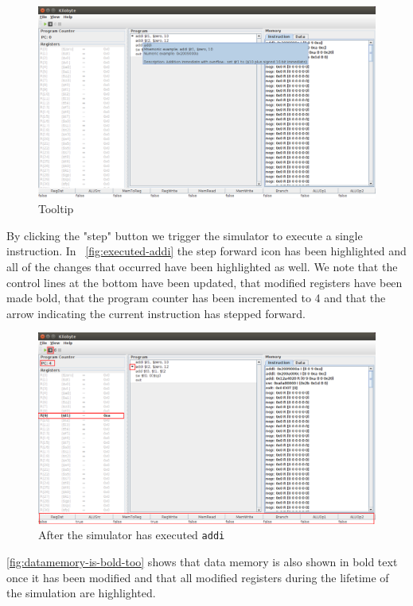 \begin{figure}[H]
  \centering
  \includegraphics[width=\textwidth]{images/mouse_over_tooltip.png} 
  \caption{Tooltip} 
  \label{fig:tooltip}
\end{figure}

By clicking the "step" button we trigger the simulator to execute a
single instruction. In ~\autoref{fig:executed-addi} the step forward
icon has been highlighted and all of the changes that occurred have
been highlighted as well. We note that the control lines at the bottom
have been updated, that modified registers have been made bold, that
the program counter has been incremented to 4 and that the arrow
indicating the current instruction has stepped forward.

\begin{figure}[H]
  \centering
  \includegraphics[width=\textwidth]{images/modified_registers_are_emboldened.png} 
  \caption{After the simulator has executed \texttt{addi}} 
  \label{fig:executed-addi}
\end{figure}

\autoref{fig:datamemory-is-bold-too} shows that data memory is also
shown in bold text once it has been modified and that all modified
registers during the lifetime of the simulation are highlighted.

